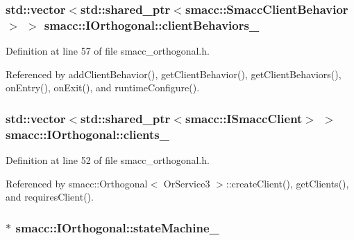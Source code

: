 \subsubsection[{\texorpdfstring{client\+Behaviors\+\_\+}{clientBehaviors_}}]{\setlength{\rightskip}{0pt plus 5cm}std\+::vector$<$std\+::shared\+\_\+ptr$<${\bf smacc\+::\+Smacc\+Client\+Behavior}$>$ $>$ smacc\+::\+I\+Orthogonal\+::client\+Behaviors\+\_\+\hspace{0.3cm}{\ttfamily [private]}}\hypertarget{classsmacc_1_1IOrthogonal_a8e3a85158f85978f8cc01cca7b1d4091}{}\label{classsmacc_1_1IOrthogonal_a8e3a85158f85978f8cc01cca7b1d4091}


Definition at line 57 of file smacc\+\_\+orthogonal.\+h.



Referenced by add\+Client\+Behavior(), get\+Client\+Behavior(), get\+Client\+Behaviors(), on\+Entry(), on\+Exit(), and runtime\+Configure().

\subsubsection[{\texorpdfstring{clients\+\_\+}{clients_}}]{\setlength{\rightskip}{0pt plus 5cm}std\+::vector$<$std\+::shared\+\_\+ptr$<${\bf smacc\+::\+I\+Smacc\+Client}$>$ $>$ smacc\+::\+I\+Orthogonal\+::clients\+\_\+\hspace{0.3cm}{\ttfamily [protected]}}\hypertarget{classsmacc_1_1IOrthogonal_ad3e5fb55db8c40ff178b22c92c9c9cd3}{}\label{classsmacc_1_1IOrthogonal_ad3e5fb55db8c40ff178b22c92c9c9cd3}


Definition at line 52 of file smacc\+\_\+orthogonal.\+h.



Referenced by smacc\+::\+Orthogonal$<$ Or\+Service3 $>$\+::create\+Client(), get\+Clients(), and requires\+Client().

\subsubsection[{\texorpdfstring{state\+Machine\+\_\+}{stateMachine_}}]{$\ast$ smacc\+::\+I\+Orthogonal\+::state\+Machine\+\_\+\hspace{0.3cm}{\ttfamily [private]}}\hypertarget{classsmacc_1_1IOrthogonal_a6c62a3a971d827d0b2c0b273a49a2129}{}\label{classsmacc_1_1IOrthogonal_a6c62a3a971d827d0b2c0b273a49a2129}


